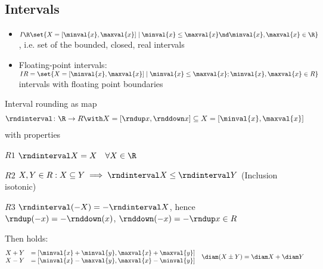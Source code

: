 \subsection*{Intervals}
	\begin{itemize}
		\item $I\R \set{X=[\minval{x},\maxval{x}] \mid \minval{x}\le \maxval{x}\nd \minval{x},\maxval{x} \in \R}$ , i.e. set of the bounded, closed, real intervals
		\item Floating-point intervals: $IR =  \set{X=[\minval{x},\maxval{x}] \mid \minval{x}\le \maxval{x}; \minval{x},\maxval{x} \in R}$ intervals with floating point boundaries
	\end{itemize}
\begin{*definition}
	Interval rounding as map 
	\begin{align*}
		\rndinterval \colon \R \to R \with X=[\rndup x, \rnddown x]\subseteq X=[\minval{x},\maxval{x}]
	\end{align*}
	with properties
	\begin{defenum}
		\item $R1$ $\rndinterval X=X \quad\forall X\in \R$ \label{def_interval_rounding_1}
		\item $R2$ $X,Y\in R: X\subseteq Y \implies \rndinterval X\le \rndinterval Y$ (Inclusion isotonic) \label{def_interval_rounding_2}
		\item $R3$ $\rndinterval(-X)=-\rndinterval X$, hence $\rndup(-x)=-\rnddown(x)$, $\rnddown(-x)=-\rndup x \in R$ \label{def_interval_rounding_3}
	\end{defenum}
	Then holds:
	\begin{align*}
	\begin{matrix}
	X + Y &= [\minval{x} + \minval{y}, \maxval{x} + \maxval{y}]\\
	X - Y &= [\minval{x} - \maxval{y}, \maxval{x} - \minval{y}]
	\end{matrix} \quad \diam(X\pm Y) = \diam X + \diam Y
	\end{align*}
\end{*definition}
